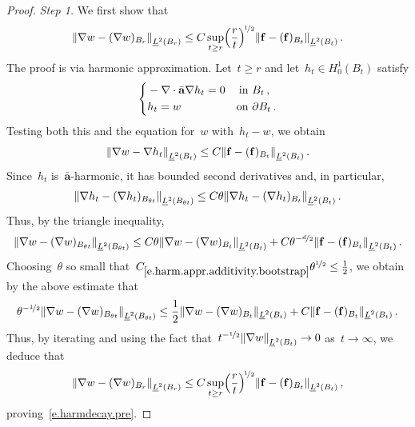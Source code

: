 \documentclass[11pt,twoside]{article} %
\numberwithin{equation}{section}
\theoremstyle{definition}
\let\originalleft\left
\let\originalright\right
\renewcommand{\left}{\mathopen{}\mathclose\bgroup\originalleft}
\renewcommand{\right}{\aftergroup\egroup\originalright}
\newcommand{\f}{\mathbf{f}}
\renewcommand{\a}{\mathbf{a}}
\newcommand{\ahom}{\bar{\a}}
\begin{document}
\begin{proof}
\emph{Step 1.} We first show that
\begin{align}  \label{e.harmdecay.pre}
\left\| \nabla w  -  (\nabla w)_{B_r} \right\|_{\underline{L}^2 \left(B_r \right)}  
\leq 
C \sup_{t \geq r}  \Bigl( \frac{r}{t} \Bigr)^{\!\nicefrac12} \left\| \f - (\f)_{B_t}  \right\|_{\underline{L}^2 \left( B_{t} \right)}  \,.
\end{align}
The proof is via harmonic approximation. Let~$t \geq r$ and let~$h_t \in H_0^1(B_t)$ satisfy
\begin{equation*}
\left\{
\begin{aligned}
&-\nabla \cdot \ahom \nabla h_t = 0 & \mbox{in} & \ B_t \,, \\
& h_t = w & \mbox{on} & \ \partial B_t \,.
\end{aligned}
\right.
\end{equation*}
Testing both this and the equation for~$w$ with~$h_t - w$, we obtain 
\begin{align*}  
\left\| \nabla w - \nabla h_t  \right\|_{\underline{L}^2 \left( B_{t} \right)} 
\leq
C 
\left\| \f - (\f)_{B_t}  \right\|_{\underline{L}^2 \left( B_{t} \right)} 
\,.
\end{align*}
Since~$h_t$ is~$\ahom$-harmonic, it has bounded second derivatives and, in particular, 
\begin{align*}  
\left\| \nabla h_t  -  (\nabla h_t)_{B_{\theta t}} \right\|_{\underline{L}^2 \left( B_{\theta t} \right)} 
\leq 
C \theta \left\| \nabla h_t  -  (\nabla h_t)_{B_{t}} \right\|_{\underline{L}^2 \left( B_{t} \right)} 
 \,.
\end{align*}
Thus, by the triangle inequality,
\begin{equation}  
\left\| \nabla w  -  (\nabla w)_{B_{\theta t}} \right\|_{\underline{L}^2 \left( B_{\theta t} \right)} 
\leq 
C \theta \left\| \nabla w  -  (\nabla w)_{B_{t}} \right\|_{\underline{L}^2 \left( B_{t} \right)} 
+ 
C \theta^{-\nicefrac d2} \left\| \f - (\f)_{B_t}  \right\|_{\underline{L}^2 \left( B_{t} \right)} 
 \,.
 \label{e.harm.appr.additivity.bootstrap}
 \end{equation}
Choosing~$\theta$ so small that~$C_{\eqref{e.harm.appr.additivity.bootstrap}} \theta^{\nicefrac12} \leq \frac12$, we obtain by the above estimate that
\begin{align*}  
\theta^{-\nicefrac12}  \left\| \nabla w  -  (\nabla w)_{B_{\theta t}} \right\|_{\underline{L}^2 \left( B_{\theta t} \right)} 
\leq 
\frac12 \| \nabla w  -  (\nabla w)_{B_{t}} \|_{\underline{L}^2 \left( B_{t} \right)} 
+ 
C  \| \f - (\f)_{B_t}  \|_{\underline{L}^2 \left( B_{t} \right)} 
\,.
\end{align*}
Thus, by iterating and using the fact that~$t^{-\nicefrac12}\left\| \nabla w \right\|_{\underline{L}^2 \left( B_{t} \right)} \to 0$ as~$t\to \infty$, we deduce that
\begin{align*}  
\left\| \nabla w  -  (\nabla w)_{B_{r}} \right\|_{\underline{L}^2 \left( B_{r} \right)}  
\leq 
C \sup_{t \geq r}  \Bigl( \frac{r}{t} \Bigr)^{\!\nicefrac12} \left\| \f - (\f)_{B_t}  \right\|_{\underline{L}^2 \left( B_{t} \right)}  \,,
\end{align*}
proving~\eqref{e.harmdecay.pre}.
\smallskip


\end{proof}
\end{document}
